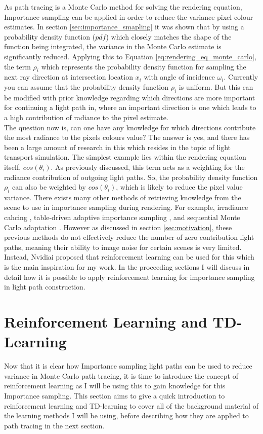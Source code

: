 \documentclass[ %
                    author={Callum Pearce},
                supervisor={Dr. Neill Campbell},
                    degree={MEng},
                     title={How effective are Temporal difference learning methods for reducing the number of zero contribution light paths while still accurately approximating Global Illumination in Path tracing?},
                  subtitle={},
                      type={research},
                      year={2019} ]{dissertation}
\begin{document}
As path tracing is a Monte Carlo method for solving the rendering equation, Importance sampling can be applied in order to reduce the variance pixel colour estimates. In section \ref{sec:importance_smapling} it was shown that by using a probability density function ($pdf$) which closely matches the shape of the function being integrated, the variance in the Monte Carlo estimate is significantly reduced. Applying this to Equation \ref{eq:rendering_eq_monte_carlo}, the term $\rho_i$ which represents the probability density function for sampling the next ray direction at intersection location $x_i$ with angle of incidence $\omega_i$. Currently you can assume that the probability density function $\rho_i$ is uniform. But this can be modified with prior knowledge regarding which directions are more important for continuing a light path in, where an important direction is one which leads to a high contribution of radiance to the pixel estimate.\\

The question now is, can one have any knowledge for which directions contribute the most radiance to the pixels colours value? The answer is yes, and there has been a large amount of research in this which resides in the topic of light transport simulation. The simplest example lies within the rendering equation itself, $cos(\theta_i)$. As previously discussed, this term acts as a weighting for the radiance contribution of outgoing light paths. So, the probability density function $\rho_i$ can also be weighted by $cos(\theta_i)$, which is likely to reduce the pixel value variance. There exists many other methods of retrieving knowledge from the scene to use in importance sampling during rendering. For example, irradiance cahcing \cite{bashford2012significance}, table-driven adaptive importance sampling \cite{cline2008table}, and sequential Monte Carlo adaptation \cite{pegoraro2008towards}. However as discussed in section \ref{sec:motivation}, these previous methods do not effectively reduce the number of zero contribution light paths, meaning their ability to image noise for certain scenes is very limited. Instead, Nvidiai proposed that reinforcement learning can be used for this \cite{dahm2017learning} which is the main inspiration for my work. In the proceeding sections I will discuss in detail how it is possible to apply reinforcement learning for importance sampling in light path construction.

\section{Reinforcement Learning and TD-Learning}
Now that it is clear how Importance sampling light paths can be used to reduce variance in Monte Carlo path tracing, it is time to introduce the concept of reinforcement learning as I will be using this to gain knowledge for this Importance sampling. This section aims to give a quick introduction to reinforcement learning and TD-learning to cover all of the background material of the learning methods I will be using, before describing how they are applied to path tracing in the next section.
\end{document}
